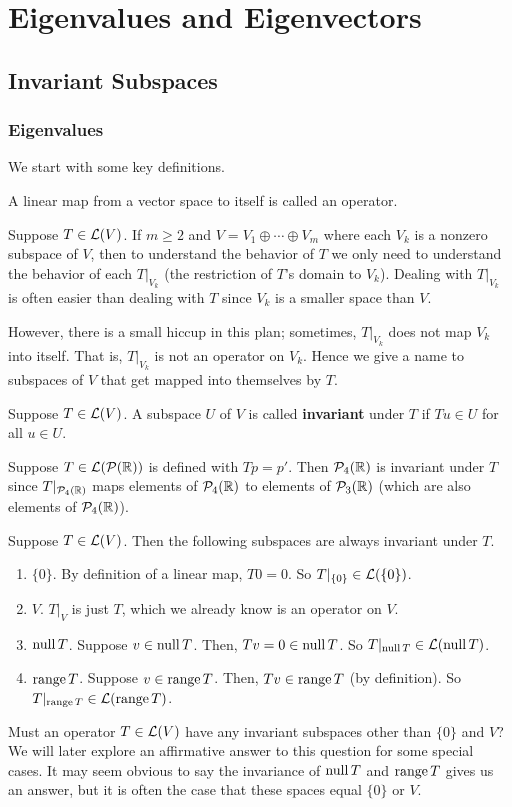 \chapter{Eigenvalues and Eigenvectors}
\section{Invariant Subspaces}
\subsection*{Eigenvalues}
We start with some key definitions.
\begin{definition}[Operator]
    A linear map from a vector space to itself is called an operator.
\end{definition}
Suppose $T\in\mathcal{L}(V)$. If $m \ge 2$ and $V = V_1 \oplus \cdots \oplus V_m$ where each $V_k$ is a nonzero subspace of $V$, then to understand the behavior of $T$ we only need to understand the behavior of each $T|_{V_k}$ (the restriction of $T$'s domain to $V_k$). Dealing with $T|_{V_k}$ is often easier than dealing with $T$ since $V_k$ is a smaller space than $V$.

However, there is a small hiccup in this plan; sometimes, $T|_{V_k}$ does not map $V_k$ into itself. That is, $T|_{V_k}$ is not an operator on $V_k$. Hence we give a name to subspaces of $V$ that get mapped into themselves by $T$.
\begin{definition}
    Suppose $T\in\mathcal{L}(V)$. A subspace $U$ of $V$ is called \textbf{invariant} under $T$ if $Tu\in U$ for all $u\in U$.
\end{definition}
\begin{example}
    Suppose $T\in\mathcal{L}(\mathcal{P}(\mathbb{R}))$ is defined with $Tp = p'$. Then $\mathcal{P}_4(\mathbb{R})$ is invariant under $T$ since $T|_{\mathcal{P}_4(\mathbb{R})}$ maps elements of $\mathcal{P}_4(\mathbb{R})$ to elements of $\mathcal{P}_3(\mathbb{R})$ (which are also elements of $\mathcal{P}_4(\mathbb{R})$).
\end{example}
\begin{example}
    Suppose $T\in\mathcal{L}(V)$. Then the following subspaces are always invariant under $T$.
    \begin{enumerate}
        \item $\{0\}$. By definition of a linear map, $T0=0$. So $T|_{\{0\}} \in \mathcal{L}(\{0\})$.
        \item $V$. $T|_V$ is just $T$, which we already know is an operator on $V$.
        \item $\operatorname{null} T$. Suppose $v\in \operatorname{null} T$. Then, $Tv = 0 \in \operatorname{null} T$. So $T|_{\operatorname{null} T} \in \mathcal{L}(\operatorname{null} T)$.
        \item $\operatorname{range} T$. Suppose $v\in \operatorname{range} T$. Then, $Tv \in \operatorname{range} T$ (by definition). So $T|_{\operatorname{range} T} \in \mathcal{L}(\operatorname{range} T)$.
    \end{enumerate}
\end{example}    
Must an operator $T\in\mathcal{L}(V)$ have any invariant subspaces other than $\{0\}$ and $V$? We will later explore an affirmative answer to this question for some special cases. It may seem obvious to say the invariance of $\operatorname{null} T$ and $\operatorname{range} T$ gives us an answer, but it is often the case that these spaces equal $\{0\}$ or $V$.

